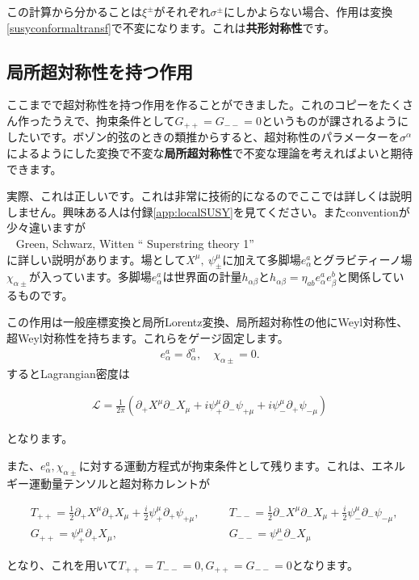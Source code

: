 \documentclass[report,paper=a4, fontsize=12pt, line_length=16cm, number_of_lines=34,dvipdfmx]{jlreq}
\newenvironment{important}{\begin{tcolorbox}[
  colback = white,
  colframe = red!35,
  boxrule = 2mm,
  fonttitle = \bfseries,
  after = \noindent] }{\end{tcolorbox}}
\newenvironment{mycite}{\\ \qquad \textbullet\ }{\\}
\numberwithin{equation}{chapter}
\numberwithin{equation}{section}
\newcommand{\del}{\partial}
\newcommand{\kyou}[1]{{\sffamily \bfseries #1}}
\newcommand{\Lcal}{\mathcal{L}}
\begin{document}
この計算から分かることは$\xi^{\pm}$がそれぞれ$\sigma^{\pm}$にしかよらない場合、作用は変換\eqref{susyconformaltransf}で不変になります。これは\kyou{共形対称性}です。

\subsection{局所超対称性を持つ作用}
ここまでで超対称性を持つ作用を作ることができました。これのコピーをたくさん作ったうえで、拘束条件として$G_{++}=G_{--}=0$というものが課されるようにしたいです。ボゾン的弦のときの類推からすると、超対称性のパラメーターを$\sigma^{\alpha}$によるようにした変換で不変な\kyou{局所超対称性}で不変な理論を考えればよいと期待できます。

実際、これは正しいです。これは非常に技術的になるのでここでは詳しくは説明しません。興味ある人は付録\ref{app:localSUSY}を見てください。またconventionが少々違いますが
\begin{mycite}
  Green, Schwarz, Witten `` Superstring theory 1''
\end{mycite}
に詳しい説明があります。場として$X^{\mu},\ \psi^{\mu}_{\pm}$に加えて多脚場$e^{a}_{\alpha}$とグラビティーノ場$\chi_{\alpha \pm}$が入っています。多脚場$e^{a}_{\alpha}$は世界面の計量$h_{\alpha\beta}$と$h_{\alpha\beta}=\eta_{ab}e^{a}_{\alpha}e^{b}_{\beta}$と関係しているものです。

この作用は一般座標変換と局所Lorentz変換、局所超対称性の他にWeyl対称性、超Weyl対称性を持ちます。これらをゲージ固定します。
\begin{align}
  e^{a}_{\alpha}=\delta^{a}_{\alpha},\quad \chi_{\alpha \pm}=0.
\end{align}
するとLagrangian密度は
\begin{important}
  \begin{align}
    \Lcal = \frac{1}{2\pi}\left( 
      \del_{+}X^{\mu}\del_{-}X_{\mu}+i\psi^{\mu}_{+}\del_{-}\psi_{+\mu}
      +i\psi^{\mu}_{-}\del_{+}\psi_{-\mu}
     \right)
     \label{supergaugefixedaction}
  \end{align}    
\end{important}
となります。

また、$e^{a}_{\alpha},\chi_{\alpha\pm}$に対する運動方程式が拘束条件として残ります。これは、エネルギー運動量テンソルと超対称カレントが
\begin{important}
  \begin{align}
    &T_{++}=\frac12\del_{+}X^{\mu}\del_{+}X_{\mu}+\frac{i}{2}\psi^{\mu}_{+}\del_{+}\psi_{+\mu},\quad &&
  T_{--}=\frac12\del_{-}X^{\mu}\del_{-}X_{\mu}+\frac{i}{2}\psi^{\mu}_{-}\del_{-}\psi_{-\mu},\nonumber\\
  &G_{++}=\psi^{\mu}_{+}\del_{+}X_{\mu},&&
  G_{--}=\psi^{\mu}_{-}\del_{-}X_{\mu}
  \end{align}    
\end{important}
となり、これを用いて$T_{++}=T_{--}=0,G_{++}=G_{--}=0$となります。
\end{document}
